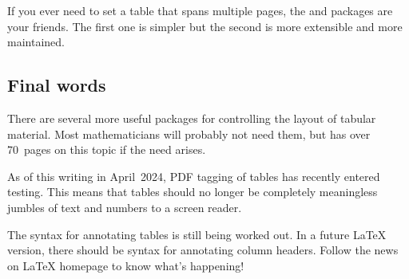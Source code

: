 If you ever need to set a table that spans multiple pages,
the  and  packages are your friends.
The first one is simpler but the second is more extensible and more maintained.



%
%
\subsection{Final words}

There are several more useful packages for controlling the layout of tabular material.
Most mathematicians will probably not need them,
but \cite{TLC} has over 70~pages on this topic if the need arises.

\begin{latexthree}
As of this writing in April~2024,
PDF tagging of tables has recently entered testing.
This means that tables should no longer be completely meaningless jumbles of text and numbers
to a screen reader.

The syntax for annotating tables is still being worked out.
In a future \LaTeX{} version, there should be syntax for annotating column headers.
Follow the news on \LaTeX{} homepage to know what's happening!
\end{latexthree}
